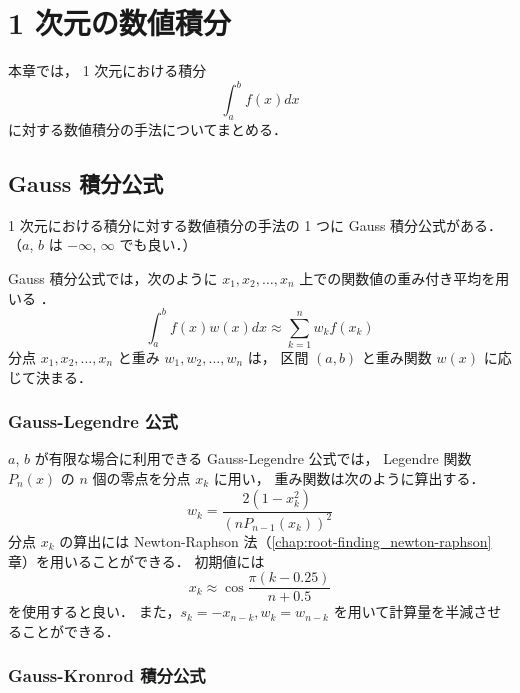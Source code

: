 %

\chapter{1 次元の数値積分}

本章では，
1 次元における積分
\begin{equation}
    \int_{a}^{b} f(x) dx
\end{equation}
に対する数値積分の手法についてまとめる．

\section{Gauss 積分公式}

1 次元における積分に対する数値積分の手法の 1 つに Gauss 積分公式がある．
（$a$, $b$ は $-\infty$, $\infty$ でも良い．）

Gauss 積分公式では，次のように $x_1, x_2, \ldots, x_n$ 上での関数値の重み付き平均を用いる
\cite{Mori1993}．
\begin{equation}
    \int_{a}^{b} f(x) w(x) dx \approx \sum_{k = 1}^n w_k f(x_k)
    \label{eq:integration_one-dim_gauss-general}
\end{equation}
分点 $x_1, x_2, \ldots, x_n$ と重み $w_1, w_2, \ldots, w_n$ は，
区間 $(a, b)$ と重み関数 $w(x)$ に応じて決まる．

\subsection{Gauss-Legendre 公式}

$a$, $b$ が有限な場合に利用できる Gauss-Legendre 公式では，
Legendre 関数 $P_n(x)$ の $n$ 個の零点を分点 $x_k$ に用い，
重み関数は次のように算出する\cite{Mori1993}．
\begin{equation}
    w_k = \frac{2(1 - x_k^2)}{(n P_{n-1}(x_k))^2}
\end{equation}
分点 $x_k$ の算出には Newton-Raphson 法（\ref{chap:root-finding_newton-raphson} 章）を用いることができる．
初期値には
\begin{equation}
    x_k \approx \cos{\frac{\pi (k - 0.25)}{n + 0.5}}
\end{equation}
を使用すると良い\cite{Mori1993}．
また，$s_k = -x_{n-k}, w_k = w_{n-k}$ を用いて計算量を半減させることができる．

\subsection{Gauss-Kronrod 積分公式}\label{sec:integration_one-dim_gauss-kronrod}

